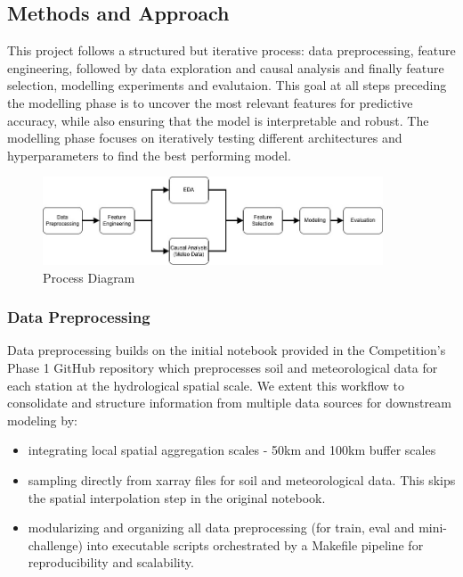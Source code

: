 \documentclass[ruler]{CUP-JNL-EDS}%
\begin{document}
\subsection{Methods and Approach} 
This project follows a structured but iterative process: data preprocessing, feature engineering, 
followed by data exploration and causal analysis and finally feature selection, modelling experiments and evalutaion.
This goal at all steps preceding the modelling phase is to uncover the most relevant features for predictive accuracy,
while also ensuring that the model is interpretable and robust. The modelling phase focuses on iteratively testing different 
architectures and hyperparameters to find the best performing model.

\begin{figure}[htbp]
    \includegraphics[width=0.9\textwidth]{./assets/method.jpg}
    \caption{Process Diagram}
    \label{fig:process_diagram}
\end{figure}

\subsubsection{Data Preprocessing}
Data preprocessing builds on the initial notebook provided in the Competition's Phase 1 GitHub repository 
which preprocesses soil and meteorological data for each station at the hydrological spatial scale. We extent 
this workflow to consolidate and structure information from multiple data sources for downstream modeling by:

\begin{itemize}
    \item integrating local spatial aggregation scales - 50km and 100km buffer scales
    \item sampling directly from xarray files for soil and meteorological data. This skips the spatial
    interpolation step in the original notebook. 
    \item modularizing and organizing all data preprocessing (for train, eval and mini-challenge) 
    into executable scripts orchestrated by a Makefile pipeline for reproducibility and scalability.
\end{itemize} 
\end{document}
